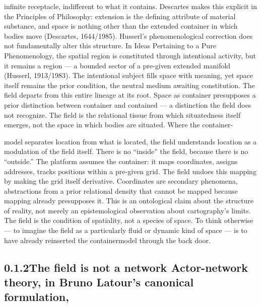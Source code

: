 infinite receptacle, indifferent to what it contains. Descartes makes this explicit in the Principles of Philosophy: extension is the defining attribute of material substance, and space is nothing other than the extended container in which bodies move (Descartes, 1644/1985). Husserl’s phenomenological correction does not fundamentally alter this structure. In Ideas Pertaining to a Pure Phenomenology, the spatial region is constituted through intentional activity, but it remains a region — a bounded sector of a pre-given extended manifold (Husserl, 1913/1983). The intentional subject fills space with meaning, yet space itself remains the prior condition, the neutral medium awaiting constitution. The field departs from this entire lineage at its root. Space as container presupposes a prior distinction between container and contained — a distinction the field does not recognize. The field is the relational tissue from which situatedness itself emerges, not the space in which bodies are situated. Where the container-

model separates location from what is located, the field understands location as a modulation of the field itself. There is no “inside” the field, because there is no “outside.” The platform assumes the container: it maps coordinates, assigns addresses, tracks positions within a pre-given grid. The field undoes this mapping by making the grid itself derivative. Coordinates are secondary phenomena, abstractions from a prior relational density that cannot be mapped because mapping already presupposes it. This is an ontological claim about the structure of reality, not merely an epistemological observation about cartography’s limits. The field is the condition of spatiality, not a species of space. To think otherwise — to imagine the field as a particularly fluid or dynamic kind of space — is to have already reinserted the containermodel through the back door.

\subsection{0.1.2\quad The field is not a network Actor-network theory, in Bruno Latour’s canonical formulation,}

